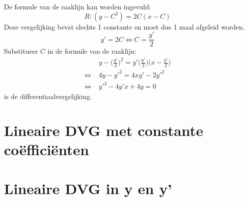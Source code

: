 {\begin{enumerate}
De formule van de raaklijn kan worden ingevuld:
$$R: (y - C^2) = 2C(x - C)$$
Deze vergelijking bevat slechts 1 constante en moet dus 1 maal afgeleid worden.
$$y' = 2C \Leftrightarrow C = \frac{y'}{2}$$
Substitueer $C$ in de formule van de raaklijn:
\begin{equation*}
\begin{split}
    & y - \bigg(\frac{y'}{2}\bigg)^2 = y'\bigg(\frac{y'}{2}\bigg)\bigg(x - \frac{y'}{2}\bigg) \\
    \Leftrightarrow \; & 4y - y'^2 = 4xy' - 2y'^2 \\
    \Leftrightarrow \; & y'^2 - 4y'x + 4y = 0
\end{split}
\end{equation*}
is de differentiaalvergelijking.
\end{enumerate}
}
\section{Lineaire DVG met constante coëfficiënten}

\section{Lineaire DVG in y en y'}
